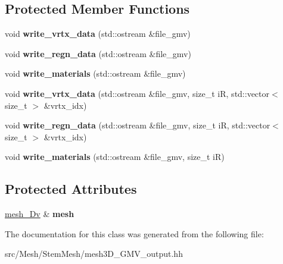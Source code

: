 \subsection*{Protected Member Functions}
\begin{DoxyCompactItemize}
\item 
\mbox{\label{classStemMesh3D_1_1mesh3Dv__GMV__output_ae1167b22a52e1542e94aeaba932c2968}} 
void {\bfseries write\+\_\+vrtx\+\_\+data} (std\+::ostream \&file\+\_\+gmv)
\item 
\mbox{\label{classStemMesh3D_1_1mesh3Dv__GMV__output_a4628c1d736ec019cfb3aaf946c5f32e8}} 
void {\bfseries write\+\_\+regn\+\_\+data} (std\+::ostream \&file\+\_\+gmv)
\item 
\mbox{\label{classStemMesh3D_1_1mesh3Dv__GMV__output_aec46bf4128c580f140f6b9fb7ce6e53f}} 
void {\bfseries write\+\_\+materials} (std\+::ostream \&file\+\_\+gmv)
\item 
\mbox{\label{classStemMesh3D_1_1mesh3Dv__GMV__output_af697ddcdff5b9fabdc00817044eac4a3}} 
void {\bfseries write\+\_\+vrtx\+\_\+data} (std\+::ostream \&file\+\_\+gmv, size\+\_\+t iR, std\+::vector$<$ size\+\_\+t $>$ \&vrtx\+\_\+idx)
\item 
\mbox{\label{classStemMesh3D_1_1mesh3Dv__GMV__output_a0acd11a310f67e14dec3ba43614c4611}} 
void {\bfseries write\+\_\+regn\+\_\+data} (std\+::ostream \&file\+\_\+gmv, size\+\_\+t iR, std\+::vector$<$ size\+\_\+t $>$ \&vrtx\+\_\+idx)
\item 
\mbox{\label{classStemMesh3D_1_1mesh3Dv__GMV__output_acdcfd4073fb70bcb1d9b956b628bca38}} 
void {\bfseries write\+\_\+materials} (std\+::ostream \&file\+\_\+gmv, size\+\_\+t iR)
\end{DoxyCompactItemize}
\subsection*{Protected Attributes}
\begin{DoxyCompactItemize}
\item 
\mbox{\label{classStemMesh3D_1_1mesh3Dv__GMV__output_a4e8d3c4f9b806cf4aa774de10a47ff58}} 
\hyperlink{classStemMesh3D_1_1mesh__3Dv}{mesh\+\_\+Dv} \& {\bfseries mesh}
\end{DoxyCompactItemize}


The documentation for this class was generated from the following file\+:\begin{DoxyCompactItemize}
\item 
src/\+Mesh/\+Stem\+Mesh/mesh3\+D\+\_\+\+G\+M\+V\+\_\+output.\+hh\end{DoxyCompactItemize}
